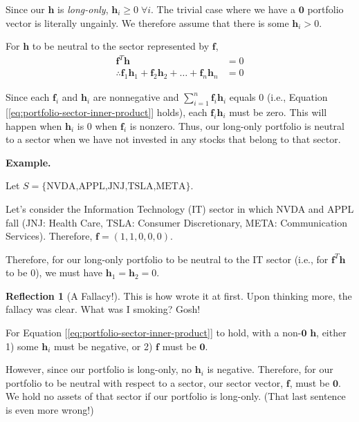 \documentclass[11pt]{book}
\theoremstyle{definition}
\theoremstyle{plain}
\theoremstyle{problemstyle}
\theoremstyle{remark}
\theoremstyle{definition}
\newtheorem{reflection}{Reflection}
\begin{document}
Since our $\boldsymbol{h}$ is \emph{long-only}, $\boldsymbol{h}_i\geq 0\;\forall i$. The trivial case where we have a $\boldsymbol{0}$ portfolio vector is literally ungainly. We therefore assume that there is some $\boldsymbol{h}_i>0$.

For $\boldsymbol{h}$ to be neutral to the sector represented by $\boldsymbol{f}$, 
\begin{equation}
    \label{eq:portfolio-sector-inner-product}
    \begin{aligned}
        \boldsymbol{f}^T\boldsymbol{h}&=0\\
        \therefore\boldsymbol{f}_1\boldsymbol{h}_1+\boldsymbol{f}_2\boldsymbol{h}_2+\dots+\boldsymbol{f}_n\boldsymbol{h}_n&=0
    \end{aligned}
\end{equation}

Since each $\boldsymbol{f}_i$ and $\boldsymbol{h}_i$ are nonnegative and $\sum_{i=1}^{n}\boldsymbol{f}_i\boldsymbol{h}_i$ equals $0$ (i.e., Equation [\ref{eq:portfolio-sector-inner-product}] holds), each $\boldsymbol{f}_i\boldsymbol{h}_i$ must be zero. This will happen when $\boldsymbol{h}_i$ is $0$ when $\boldsymbol{f}_i$ is nonzero. Thus, our long-only portfolio is neutral to a sector when we have not invested in any stocks that belong to that sector.

\textbf{Example.} 

Let $S=\{\text{NVDA,APPL,JNJ,TSLA,META}\}$.

Let's consider the Information Technology (IT) sector in which NVDA and APPL fall (JNJ: Health Care, TSLA: Consumer Discretionary, META: Communication Services). Therefore, $\boldsymbol{f}=(1,1,0,0,0)$.

Therefore, for our long-only portfolio to be neutral to the IT sector (i.e., for $\boldsymbol{f}^T\boldsymbol{h}$ to be $0$), we must have $\boldsymbol{h}_1=\boldsymbol{h}_2=0$.

\begin{reflection}[A Fallacy!]
This is how wrote it at first. Upon thinking more, the fallacy was clear. What was I smoking? Gosh!

{\color{red} {
        For Equation [\ref{eq:portfolio-sector-inner-product}] to hold, with a non-$\boldsymbol{0}$ $\boldsymbol{h}$, either 1) some $\boldsymbol{h}_i$ must be negative, or 2) $\boldsymbol{f}$ must be $\boldsymbol{0}$.

    However, since our portfolio is long-only, no $\boldsymbol{h}_i$ is negative. Therefore, for our portfolio to be neutral with respect to a sector, our sector vector, $\boldsymbol{f}$, must be $\boldsymbol{0}$. We hold no assets of that sector if our portfolio is long-only.
    (That last sentence is even more wrong!)}
}

\end{reflection}
\end{document}
